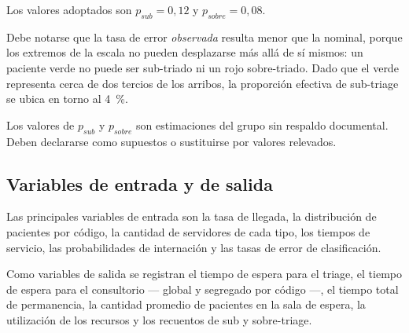 Los valores adoptados son $p_{sub} = 0{,}12$ y $p_{sobre} = 0{,}08$.

Debe notarse que la tasa de error \emph{observada} resulta menor que la
nominal, porque los extremos de la escala no pueden desplazarse más allá de
sí mismos: un paciente verde no puede ser sub-triado ni un rojo
sobre-triado. Dado que el verde representa cerca de dos tercios de los
arribos, la proporción efectiva de sub-triage se ubica en torno al 4~\%.

\begin{pendiente}
Los valores de $p_{sub}$ y $p_{sobre}$ son estimaciones del grupo sin
respaldo documental. Deben declararse como supuestos o sustituirse por
valores relevados.
\end{pendiente}

\subsection{Variables de entrada y de salida}

Las principales variables de entrada son la tasa de llegada, la distribución
de pacientes por código, la cantidad de servidores de cada tipo, los tiempos
de servicio, las probabilidades de internación y las tasas de error de
clasificación.

Como variables de salida se registran el tiempo de espera para el triage, el
tiempo de espera para el consultorio --- global y segregado por código ---,
el tiempo total de permanencia, la cantidad promedio de pacientes en la sala
de espera, la utilización de los recursos y los recuentos de sub y
sobre-triage.

